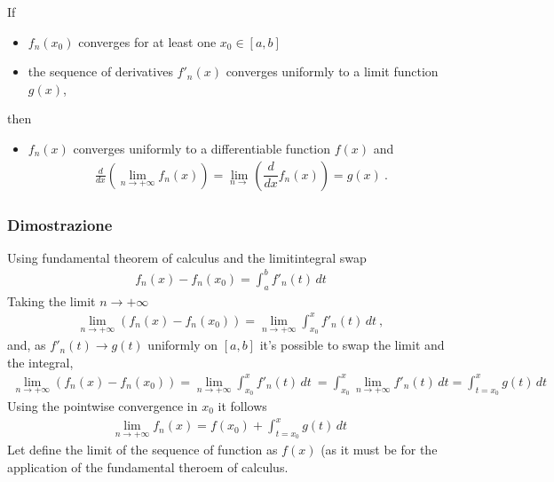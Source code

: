 \documentclass[letterpaper,10pt,italian]{jupyterBook}
\begin{document}
\sphinxAtStartPar
If
\begin{itemize}
\item {} 
\sphinxAtStartPar
\(f_n(x_0)\) converges for at least one \(x_0 \in [a,b]\)

\item {} 
\sphinxAtStartPar
the sequence of derivatives \(f'_n(x)\) converges uniformly to a limit function \(g(x)\),

\end{itemize}

\sphinxAtStartPar
then
\begin{itemize}
\item {} 
\sphinxAtStartPar
\(f_n(x)\) converges uniformly to a differentiable function \(f(x)\) and
\begin{equation*}
\begin{split}\frac{d}{dx}\left( \lim_{n \rightarrow +\infty} f_n(x) \right) = \lim_{n\rightarrow} \left( \dfrac{d}{dx} f_n(x) \right) = g(x) \ .\end{split}
\end{equation*}
\end{itemize}
\subsubsection*{Dimostrazione}

\sphinxAtStartPar
{} Using fundamental theorem of calculus and the limit\sphinxhyphen{}integral swap
\begin{equation*}
\begin{split}f_n(x) - f_n(x_0) = \int_{a}^{b} f'_n(t) \, d t\end{split}
\end{equation*}
\sphinxAtStartPar
Taking the limit \(n \rightarrow + \infty\)
\begin{equation*}
\begin{split}\lim_{n \rightarrow +\infty} \left( f_n(x) - f_n(x_0) \right) = \lim_{n \rightarrow +\infty} \int_{x_0}^{x} f'_n(t) \, d t \ ,\end{split}
\end{equation*}
\sphinxAtStartPar
and, as \(f'_n(t) \rightarrow g(t)\) uniformly on \([a,b]\) it’s possible to swap the limit and the integral,
\begin{equation*}
\begin{split}\lim_{n \rightarrow +\infty} \left( f_n(x) - f_n(x_0) \right) = \lim_{n \rightarrow +\infty} \int_{x_0}^{x} f'_n(t) \, d t \ = \int_{x_0}^{x}  \lim_{n \rightarrow +\infty} f'_n(t) \, d t = \int_{t=x_0}^{x} g(t) \, dt\end{split}
\end{equation*}
\sphinxAtStartPar
Using the pointwise convergence in \(x_0\) it follows
\begin{equation*}
\begin{split}\lim_{n\rightarrow+\infty} f_n(x) = f(x_0) + \int_{t=x_0}^{x} g(t) \, dt \ \end{split}
\end{equation*}
\sphinxAtStartPar
Let define the limit of the sequence of function as \(f(x)\) (as it must be for the application of the fundamental theroem of calculus.
\end{document}
